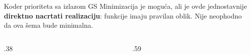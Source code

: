 \begin{frame}[t,label=03-s017]{Koder prioriteta sa izlazom GS}
\setlength{\parskip}{0pt}
Minimizacija je moguća, ali je ovde jednostavnije \textbf{direktno nacrtati realizaciju}:
funkcije imaju pravilan oblik. Nije neophodno da ova šema bude minimalna.
\par\vspace{2mm}
\begin{columns}[c,onlytextwidth]
\begin{column}{.38\textwidth}\centering
\par\vspace{1.5mm}
{\fontsize{10}{12}\selectfont}
\end{column}
\begin{column}{.59\textwidth}\centering
\begingroup
\def\DEenable{0}\def\DEjedinica{.88cm}\def\DEvisinaPrioriteta{.70cm}\def\DEgejt{.55}

\endgroup
\end{column}
\end{columns}
\end{frame}
